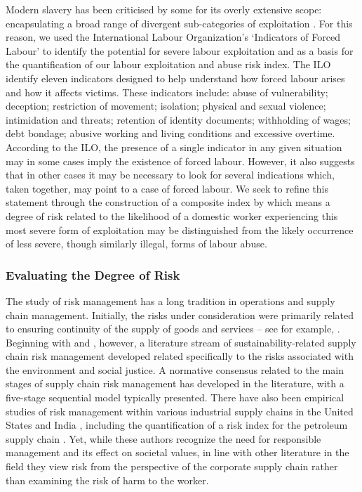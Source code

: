 \documentclass[
  12pt,
  letterpaper,
  DIV=11,
  numbers=noendperiod]{scrartcl}
\theoremstyle{plain}
\theoremstyle{definition}
\begin{document}
Modern slavery has been criticised by some for its overly extensive
scope: encapsulating a broad range of divergent sub-categories of
exploitation
\autocite{oconnell_davidson_margins_2015,gutierrez-huerter_o_change_2023}.
For this reason, we used the International Labour Organization's
\autocite{ILO11-indicators} `Indicators of Forced Labour' to identify
the potential for severe labour exploitation and as a basis for the
quantification of our labour exploitation and abuse risk index. The ILO
identify eleven indicators designed to help understand how forced labour
arises and how it affects victims. These indicators include: abuse of
vulnerability; deception; restriction of movement; isolation; physical
and sexual violence; intimidation and threats; retention of identity
documents; withholding of wages; debt bondage; abusive working and
living conditions and excessive overtime. According to the ILO, the
presence of a single indicator in any given situation may in some cases
imply the existence of forced labour. However, it also suggests that in
other cases it may be necessary to look for several indications which,
taken together, may point to a case of forced labour. We seek to refine
this statement through the construction of a composite index by which
means a degree of risk related to the likelihood of a domestic worker
experiencing this most severe form of exploitation may be distinguished
from the likely occurrence of less severe, though similarly illegal,
forms of labour abuse.

\subsubsection{Evaluating the Degree of
Risk}\label{evaluating-the-degree-of-risk}

The study of risk management has a long tradition in operations and
supply chain management. Initially, the risks under consideration were
primarily related to ensuring continuity of the supply of goods and
services -- see for example, \textcite{juttner_supply_2003}. Beginning
with \textcite{anderson_critical_2006} and
\textcite{anderson_sustainability_2009}, however, a literature stream of
sustainability-related supply chain risk management developed related
specifically to the risks associated with the environment and social
justice. A normative consensus related to the main stages of supply
chain risk management has developed in the literature, with a five-stage
sequential model typically presented. There have also been empirical
studies of risk management within various industrial supply chains in
the United States and India
\autocite{tarei_hybrid_2018,dellana_scale_2021}, including the
quantification of a risk index for the petroleum supply chain
\autocite{tarei_hybrid_2018}. Yet, while these authors recognize the
need for responsible management and its effect on societal values, in
line with other literature in the field they view risk from the
perspective of the corporate supply chain rather than examining the risk
of harm to the worker.
\end{document}

